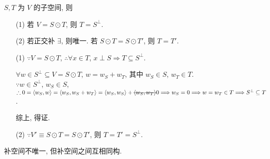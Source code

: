 \documentclass{note}
\begin{document}
\begin{thm}[(课本定理 13.12)]
    $S,T$ 为 $V$ 的子空间, 则
    \begin{itemize}
        \item[(1)] 若 $V=S\odot T$, 则 $T=S^{\perp}$.
        \item[(2)] 若正交补 $\exists$, 则唯一. 若 $S\odot T=S\odot T'$, 则 $T=T'$.
    \end{itemize}
\end{thm}
\begin{pf}
    \begin{itemize}
        \item[(1)] $\because V=S\odot T$, $\therefore\forall x\in T$, $x\perp S\Longrightarrow T\subseteq S^{\perp}$.

        $\forall w\in S^{\perp}\subseteq V=S\odot T$, $w=w_S+w_T$, 其中 $w_S\in S$, $w_T\in T$.\\
        $\because w\in S^{\perp}$, $w_S\in S$, $\therefore 0=\langle w_S,w\rangle=\langle w_S,w_S+w_T\rangle=\langle w_S,w_S\rangle+\msout{\langle w_S,w_T\rangle}0\Longrightarrow w_S=0\Longrightarrow w=w_T\in T\Longrightarrow S^{\perp}\subseteq T$.

        综上, 得证.
        \item[(2)] $\because V'\equiv S\odot T=S\odot T'$, 则 $T=T'=S^{\perp}$.
    \end{itemize}
\end{pf}

补空间不唯一, 但补空间之间互相同构.
\end{document}
